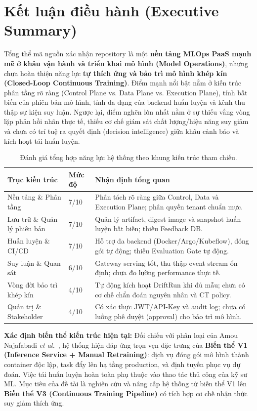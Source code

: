 \section{Kết luận điều hành (Executive Summary)}

Tổng thể mã nguồn xác nhận repository là một \textbf{nền tảng MLOps PaaS mạnh mẽ ở khâu vận hành và triển khai mô hình (Model Operations)}, nhưng chưa hoàn thiện năng lực \textbf{tự thích ứng và bảo trì mô hình khép kín (Closed-Loop Continuous Training)}. Điểm mạnh nổi bật nằm ở kiến trúc phân tầng rõ ràng (Control Plane vs. Data Plane vs. Execution Plane), tính bất biến của phiên bản mô hình, tính đa dạng của backend huấn luyện và kênh thu thập sự kiện suy luận. Ngược lại, điểm nghẽn lớn nhất nằm ở sự thiếu vắng vòng lặp phản hồi nhãn thực tế, thiếu cơ chế giám sát chất lượng/hiệu năng suy giảm và chưa có trí tuệ ra quyết định (decision intelligence) giữa khâu cảnh báo và kích hoạt tái huấn luyện.

\begin{table}[ht]
\centering
\caption{Đánh giá tổng hợp năng lực hệ thống theo khung kiến trúc tham chiếu.}
\begin{tabularx}{\linewidth}{@{}L{4.4cm} C{1.6cm} Y@{}}
\toprule
\textbf{Trục kiến trúc} & \textbf{Mức độ} & \textbf{Nhận định tổng quan} \\
\midrule
Nền tảng \& Phân tầng & 7/10 & Phân tách rõ ràng giữa Control, Data và Execution Plane; phân quyền tenant chuẩn mực. \\
Lưu trữ \& Quản lý phiên bản & 7/10 & Quản lý artifact, digest image và snapshot huấn luyện bất biến; thiếu Feedback DB. \\
Huấn luyện \& CI/CD & 7/10 & Hỗ trợ đa backend (Docker/Argo/Kubeflow), đóng gói tự động; thiếu Evaluation Gate tự động. \\
Suy luận \& Quan sát & 6/10 & Gateway serving tốt, thu thập event stream ổn định; chưa đo lường performance thực tế. \\
Vòng đời bảo trì khép kín & 4/10 & Tự động kích hoạt DriftRun khi đủ mẫu; chưa có cơ chế chẩn đoán nguyên nhân và CT policy. \\
Quản trị \& Stakeholder & 4/10 & Có xác thực JWT/API-Key và audit log; chưa có luồng phê duyệt (approval) cho bảo trì mô hình. \\
\bottomrule
\end{tabularx}
\end{table}

\textbf{Xác định biến thể kiến trúc hiện tại:} Đối chiếu với phân loại của Amou Najafabadi \textit{et al.}~\cite{najafabadi2026}, hệ thống hiện đáp ứng trọn vẹn đặc trưng của \textbf{Biến thể V1 (Inference Service + Manual Retraining)}: dịch vụ  đóng gói mô hình thành container độc lập, task  đẩy lên hạ tầng production, và  định tuyến phục vụ dự đoán. Việc tái huấn luyện hoàn toàn phụ thuộc vào thao tác thủ công của kỹ sư ML. Mục tiêu của đề tài là nghiên cứu và nâng cấp hệ thống từ biến thể V1 lên \textbf{Biến thể V3 (Continuous Training Pipeline)} có tích hợp cơ chế nhận thức suy giảm thích ứng.
